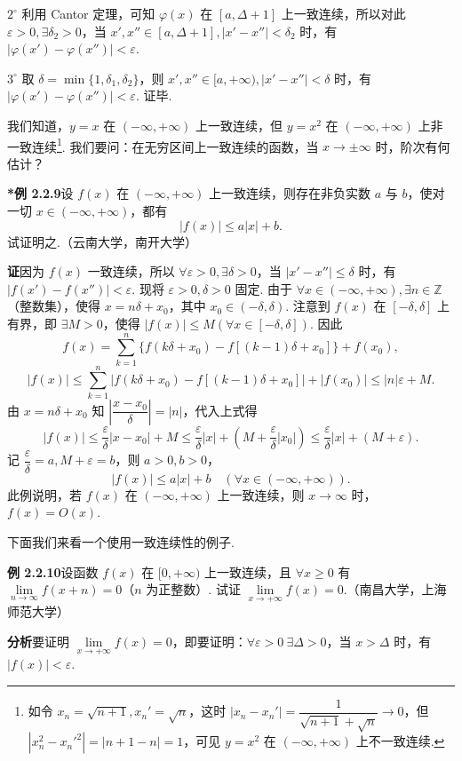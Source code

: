 \documentclass[UTF8,12pt,a4paper,fontset=fandol]{ctexart}
\begin{document}
$2^\circ$ 利用 Cantor 定理，可知 $\varphi(x)$ 在 $[a,\Delta+1]$ 上一致连续，所以对此 $\varepsilon>0,\exists\delta_2>0$，当 $x',x''\in[a,\Delta+1],|x'-x''|<\delta_2$ 时，有 $|\varphi(x')-\varphi(x'')|<\varepsilon$.

$3^\circ$ 取 $\delta=\min\{1,\delta_1,\delta_2\}$，则 $x',x''\in[a,+\infty),|x'-x''|<\delta$ 时，有 $|\varphi(x')-\varphi(x'')|<\varepsilon$. 证毕.

我们知道，$y=x$ 在 $(-\infty,+\infty)$ 上一致连续，但 $y=x^2$ 在 $(-\infty,+\infty)$ 上非一致连续\footnote{如令 $x_n=\sqrt{n+1},x_n'=\sqrt n$，这时 $|x_n-x_n'|=\dfrac1{\sqrt{n+1}+\sqrt n}\to0$，但 $|x_n^2-x_n'^2|=|n+1-n|=1$，可见 $y=x^2$ 在 $(-\infty,+\infty)$ 上不一致连续.}. 我们要问：在无穷区间上一致连续的函数，当 $x\to\pm\infty$ 时，阶次有何估计？

\noindent\textbf{*例 2.2.9}\quad 设 $f(x)$ 在 $(-\infty,+\infty)$ 上一致连续，则存在非负实数 $a$ 与 $b$，使对一切 $x\in(-\infty,+\infty)$，都有
\[
  |f(x)|\le a|x|+b.
\]
试证明之.（云南大学，南开大学）

\noindent\textbf{证}\quad 因为 $f(x)$ 一致连续，所以 $\forall\varepsilon>0,\exists\delta>0$，当 $|x'-x''|\le\delta$ 时，有 $|f(x')-f(x'')|<\varepsilon$. 现将 $\varepsilon>0,\delta>0$ 固定. 由于 $\forall x\in(-\infty,+\infty),\exists n\in\mathbb{Z}$（整数集），使得 $x=n\delta+x_0$，其中 $x_0\in(-\delta,\delta)$. 注意到 $f(x)$ 在 $[-\delta,\delta]$ 上有界，即 $\exists M>0$，使得 $|f(x)|\le M(\forall x\in[-\delta,\delta])$. 因此
\[
  f(x)=\sum_{k=1}^{n}\{f(k\delta+x_0)-f[(k-1)\delta+x_0]\}+f(x_0),
\]
\[
  |f(x)|\le\sum_{k=1}^{n}|f(k\delta+x_0)-f[(k-1)\delta+x_0]|+|f(x_0)|\le |n|\varepsilon+M.
\]
由 $x=n\delta+x_0$ 知 $\left|\dfrac{x-x_0}{\delta}\right|=|n|$，代入上式得
\[
  |f(x)|\le\frac\varepsilon\delta|x-x_0|+M\le\frac\varepsilon\delta|x|+\left(M+\frac\varepsilon\delta|x_0|\right)\le\frac\varepsilon\delta|x|+(M+\varepsilon).
\]
记 $\dfrac\varepsilon\delta=a,M+\varepsilon=b$，则 $a>0,b>0$，
\[
  |f(x)|\le a|x|+b\quad(\forall x\in(-\infty,+\infty)).
\]
此例说明，若 $f(x)$ 在 $(-\infty,+\infty)$ 上一致连续，则 $x\to\infty$ 时，$f(x)=O(x)$.

下面我们来看一个使用一致连续性的例子.

\noindent\textbf{例 2.2.10}\quad 设函数 $f(x)$ 在 $[0,+\infty)$ 上一致连续，且 $\forall x\ge0$ 有 $\lim\limits_{n\to\infty}f(x+n)=0$（$n$ 为正整数）. 试证 $\lim\limits_{x\to+\infty}f(x)=0$.（南昌大学，上海师范大学）

\noindent\textbf{分析}\quad 要证明 $\lim\limits_{x\to+\infty}f(x)=0$，即要证明：$\forall\varepsilon>0\ \exists\Delta>0$，当 $x>\Delta$ 时，有 $|f(x)|<\varepsilon$.
\end{document}
